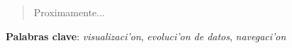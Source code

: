\newpage\thispagestyle{plain}
\label{Resumen}
\begin{center}
\vspace*{5mm}{\Large \TITULO} \\

\vspace{4mm}{\large \sergio} \\

\vspace{8mm}{\Large RESUMEN}
\end{center}

\vspace{2mm}
\begin{quote}
Proximamente...
\end{quote}
\vspace{4mm}
\noindent 
\textbf{Palabras clave}: 
\emph{visualizaci'on}, \emph{evoluci'on de datos}, \emph{navegaci'on}